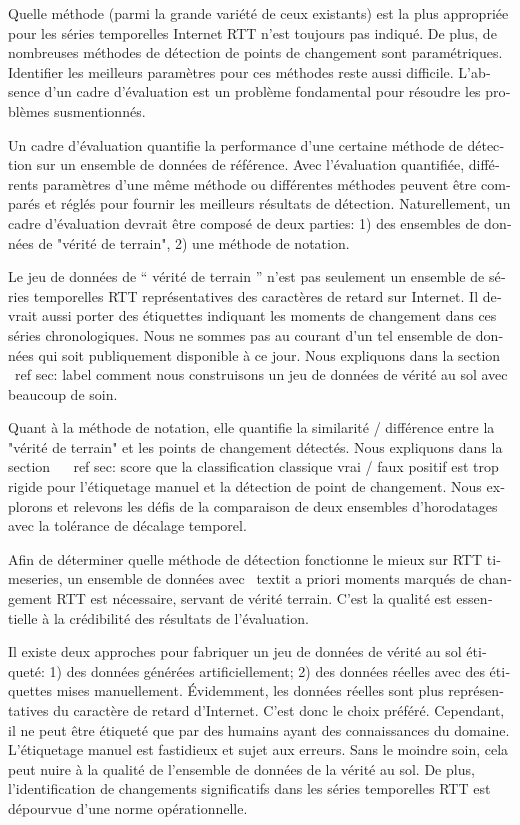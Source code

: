 \begin{otherlanguage}{french}
{Quelle méthode (parmi la grande variété de ceux existants) est la plus appropriée pour les séries temporelles Internet RTT n'est toujours pas indiqué.
De plus, de nombreuses méthodes de détection de points de changement sont paramétriques.
Identifier les meilleurs paramètres pour ces méthodes reste aussi difficile.
L'absence d'un cadre d'évaluation est un problème fondamental pour résoudre les problèmes susmentionnés.

Un cadre d'évaluation quantifie la performance d'une certaine méthode de détection sur un ensemble de données de référence.
Avec l'évaluation quantifiée, différents paramètres d'une même méthode ou différentes méthodes peuvent être comparés et réglés pour fournir les meilleurs résultats de détection.
Naturellement, un cadre d'évaluation devrait être composé de deux parties: 1) des ensembles de données de "vérité de terrain", 2) une méthode de notation.

Le jeu de données de `` vérité de terrain '' n'est pas seulement un ensemble de séries temporelles RTT représentatives des caractères de retard sur Internet.
Il devrait aussi porter des étiquettes indiquant les moments de changement dans ces séries chronologiques.
Nous ne sommes pas au courant d'un tel ensemble de données qui soit publiquement disponible à ce jour.
Nous expliquons dans la section ~ \ ref {sec: label} comment nous construisons un jeu de données de vérité au sol avec beaucoup de soin.

Quant à la méthode de notation, elle quantifie la similarité / différence entre la "vérité de terrain" et les points de changement détectés.
Nous expliquons dans la section ~ \ ref {sec: score} que la classification classique vrai / faux positif est trop rigide pour l'étiquetage manuel et la détection de point de changement.
Nous explorons et relevons les défis de la comparaison de deux ensembles d'horodatages avec la tolérance de décalage temporel.

Afin de déterminer quelle méthode de détection fonctionne le mieux sur RTT timeseries,
un ensemble de données avec \ textit {a priori} moments marqués de changement RTT est nécessaire, servant de vérité terrain.
C'est la qualité est essentielle à la crédibilité des résultats de l'évaluation.

Il existe deux approches pour fabriquer un jeu de données de vérité au sol étiqueté: 1) des données générées artificiellement; 2) des données réelles avec des étiquettes mises manuellement.
Évidemment, les données réelles sont plus représentatives du caractère de retard d'Internet.
C'est donc le choix préféré.
Cependant, il ne peut être étiqueté que par des humains ayant des connaissances du domaine.
L'étiquetage manuel est fastidieux et sujet aux erreurs.
Sans le moindre soin, cela peut nuire à la qualité de l'ensemble de données de la vérité au sol.
De plus, l'identification de changements significatifs dans les séries temporelles RTT est dépourvue d'une norme opérationnelle.

}
\end{otherlanguage}

